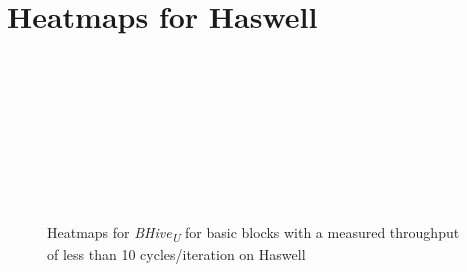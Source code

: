 \documentclass[sigconf,nonacm]{acmart}
\newcommand{\bhiveu}{\emph{BHive\textsubscript{U}}\xspace}
\begin{document}
\section{Heatmaps for Haswell}
\vfill
\begin{figure}[H]
\centering
\begin{subfigure}[t]{0.33\textwidth}\end{subfigure}~
\begin{subfigure}[t]{0.33\textwidth}\end{subfigure}~
\begin{subfigure}[t]{0.33\textwidth}\end{subfigure}\par\bigskip

\begin{subfigure}[t]{0.33\textwidth}\end{subfigure}~
\begin{subfigure}[t]{0.33\textwidth}\end{subfigure}~
\begin{subfigure}[t]{0.33\textwidth}\end{subfigure}\par\bigskip

\begin{subfigure}[t]{0.33\textwidth}\end{subfigure}~
\begin{subfigure}[t]{0.33\textwidth}\end{subfigure}
\caption{Heatmaps for \bhiveu for basic blocks with a measured throughput of less than 10 cycles/iteration on Haswell}
\end{figure}
\vfill
\end{document}
